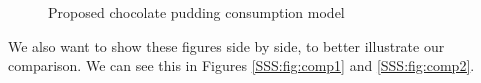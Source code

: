 \documentclass{csri10}
\begin{document}
\begin{figure}[htb]
\begin{center}
 \caption{Proposed chocolate pudding consumption model}\label{SSS:fig:cos}
\end{center}\end{figure}

We also want to show these figures side by side, to better illustrate our comparison.  We can see this in Figures
\ref{SSS:fig:comp1} and \ref{SSS:fig:comp2}.
\end{document}
